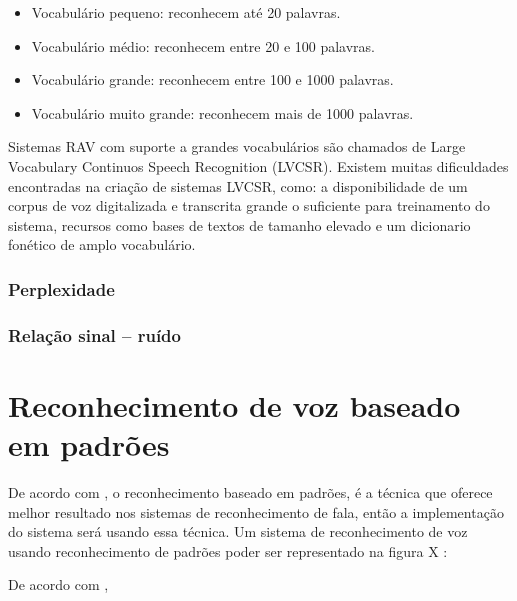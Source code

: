 \begin{itemize}
\item Vocabulário pequeno: reconhecem até 20 palavras. 
\item Vocabulário médio: reconhecem entre 20 e 100 palavras. 
\item Vocabulário grande: reconhecem entre 100 e 1000 palavras. 
\item Vocabulário muito grande: reconhecem mais de 1000 palavras. 
\end{itemize}

Sistemas RAV com suporte a grandes vocabulários são chamados de Large Vocabulary Continuos Speech Recognition (LVCSR). Existem muitas dificuldades encontradas na criação de sistemas LVCSR, como: a disponibilidade de um corpus de voz digitalizada e transcrita grande o suficiente para treinamento do sistema, recursos como bases de textos de
tamanho elevado e um dicionario fonético de amplo vocabulário.\cite{RvPatrick}
\subsubsection{Perplexidade} 

\subsubsection{Relação sinal – ruído}

\section{Reconhecimento de voz baseado em padrões}\label{sec:red_neu}
De acordo com \cite{AvaliaTecJose}, o reconhecimento baseado em padrões, é a técnica que oferece melhor resultado nos sistemas de reconhecimento de fala, então a implementação do sistema será usando essa técnica.
Um sistema de reconhecimento de voz usando reconhecimento de padrões poder ser representado na figura X \cite{FundamentRabiner}:
 

De acordo com \cite{AvaliaTecJose}, 





